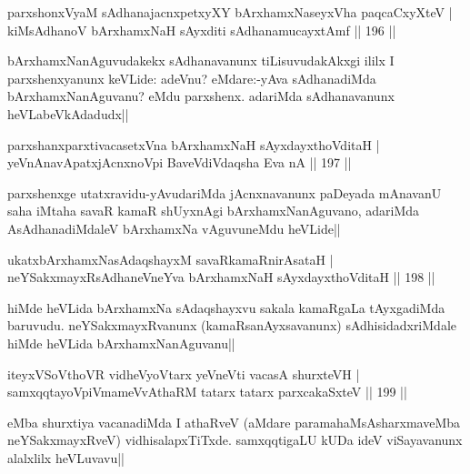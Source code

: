 \begin{shl}
parxshonxV\s yaM sAdhanajacnxpetxyXY bArxhamxNaseyxVha paqcaCxyXteV  |\\
kiMsAdhanoV bArxhamxNaH sAyxditi sAdhanamucayxtAmf \hfill || 196 ||
\end{shl}

\begin{artha}
bArxhamxNanAguvudakekx sAdhanavanunx tiLisuvudakAkxgi ililx I parxshenxyanunx keVLide: adeVnu? eMdare:-yAva sAdhanadiMda bArxhamxNanAguvanu? eMdu parxshenx. adariMda sAdhanavanunx heVLabeVkAdadudx||
\end{artha}

\begin{shl}
parxshanxparxtivacasetxVna bArxhamxNaH sAyxdayxthoVditaH |\\
yeVnAnavApatxjAcnxnoV\s pi BaveVdiVdaqsha Eva nA \hfill || 197 ||
\end{shl}

\begin{artha}
parxshenxge utatxravidu-yAvudariMda jAcnxnavanunx paDeyada mAnavanU saha iMtaha savaR kamaR shUyxnAgi bArxhamxNanAguvano, adariMda AsAdhanadiMdaleV bArxhamxNa vAguvuneMdu heVLide||
\end{artha}

\begin{shl}
ukatxbArxhamxNasAdaqshayxM savaRkamaRnirAsataH |\\
neYSakxmayxRsAdhaneVneYva bArxhamxNaH sAyxdayxthoVditaH \hfill || 198 ||
\end{shl}

\begin{artha}
hiMde heVLida bArxhamxNa sAdaqshayxvu sakala kamaRgaLa tAyxgadiMda baruvudu. neYSakxmayxRvanunx (kamaRsanAyxsavanunx) sAdhisidadxriMdale hiMde heVLida bArxhamxNanAguvanu||
\end{artha}

\begin{shl}
iteyxVSoV\s thoVR vidheVyoV\s tarx yeVneVti vacasA shurxteVH |\\
samxqqtayoV\s piVmameVvAthaRM tatarx tatarx parxcakaSxteV \hfill || 199 ||
\end{shl}

\begin{artha}
\stext eMba shurxtiya vacanadiMda I athaRveV (aMdare paramahaMsAsharxmaveMba neYSakxmayxRveV) vidhisalapxTiTxde. samxqqtigaLU kUDa ideV viSayavanunx alalxlilx heVLuvavu||
\end{artha}%


